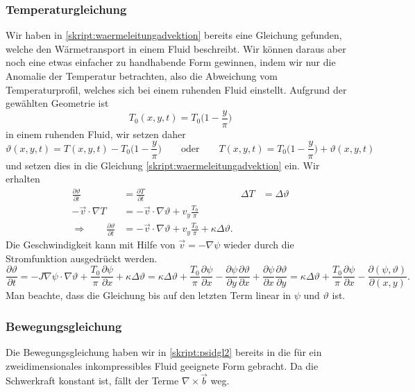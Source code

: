 \subsubsection{Temperaturgleichung}
Wir haben in \eqref{skript:waermeleitungadvektion}
bereits eine Gleichung gefunden, welche den Wärmetransport in einem 
Fluid beschreibt.
Wir können daraus aber noch eine etwas einfacher zu handhabende Form
gewinnen, indem wir nur die Anomalie der Temperatur betrachten, also
%
die Abweichung vom Temperaturprofil, welches sich bei einem ruhenden
Fluid einstellt. 
Aufgrund der gewählten Geometrie ist 
\[
T_0(x,y,t)= T_0\biggl(1- \frac{y}{\pi}\biggr)
\]
in einem ruhenden Fluid, wir setzen daher
\[
\vartheta(x,y,t)
= 
T(x,y,t)
-
T_0\biggl(1-\frac{y}{\pi}\biggr)
\qquad\text{oder}\qquad
T(x,y,t)
=
T_0\biggl(1-\frac{y}{\pi}\biggr)
+
\vartheta(x,y,t)
\]
und setzen dies in die Gleichung \eqref{skript:waermeleitungadvektion}
ein.
Wir erhalten
\[
\begin{aligned}
\frac{\partial\vartheta}{\partial t}
&=
\frac{\partial T}{\partial t}
&
\Delta T
&=
\Delta \vartheta
\\
-\vec{v}\cdot\nabla T
&=
-\vec{v}\cdot\nabla\vartheta
+v_y\frac{T_0}{\pi}
\\
\Rightarrow
\qquad
\frac{\partial\vartheta}{\partial t}
&=
-\vec{v}\cdot\nabla \vartheta
+v_y\frac{T_0}{\pi}
+
\kappa\Delta \vartheta.
\end{aligned}
\]
Die Geschwindigkeit kann mit Hilfe von $\vec{v}=-\nabla \psi$ wieder
durch die Stromfunktion ausgedrückt werden.
\begin{equation}
\frac{\partial\vartheta}{\partial t}
=
-J\nabla\psi\cdot\nabla\vartheta
+\frac{T_0}{\pi}\frac{\partial\psi}{\partial x}
+\kappa\Delta\vartheta
=
\kappa\Delta\vartheta
+\frac{T_0}{\pi}\frac{\partial\psi}{\partial x}
-\frac{\partial \psi}{\partial y}\frac{\partial \vartheta}{\partial x}
+\frac{\partial \psi}{\partial x}\frac{\partial \vartheta}{\partial y}
=
\kappa\Delta\vartheta
+\frac{T_0}{\pi}\frac{\partial\psi}{\partial x}
-
\frac{\partial(\psi,\vartheta)}{\partial(x,y)}.
\label{skript:lorenzthetagl}
\end{equation}
Man beachte, dass die Gleichung bis auf den letzten Term linear 
in $\psi$ und $\vartheta$ ist.

\subsubsection{Bewegungsgleichung}
Die Bewegungsgleichung haben wir in
\eqref{skript:psidgl2}
bereits in die für ein zweidimensionales inkompressibles Fluid
geeignete Form gebracht.
Da die Schwerkraft konstant ist, fällt der Terme $\nabla\times\vec{b}$
weg.


